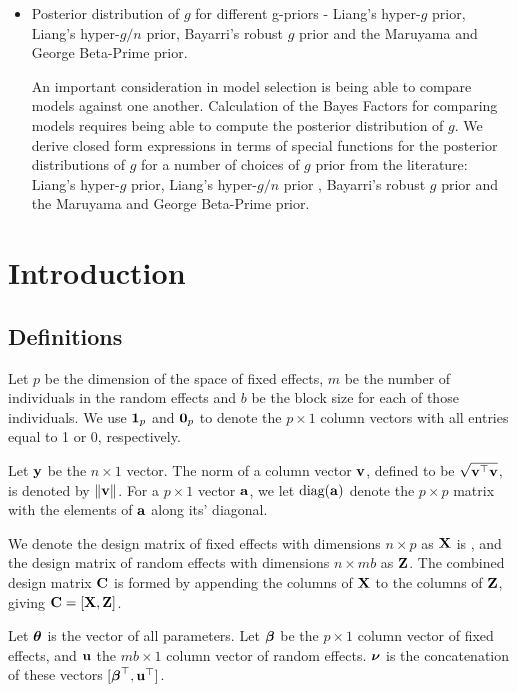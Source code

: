 \documentclass{amsart}[12pt]
\begin{document}
\begin{itemize}
	\item Posterior distribution of $g$ for different g-priors - Liang's hyper-$g$ prior, Liang's hyper-$g/n$ prior,
	Bayarri's robust $g$ prior and the Maruyama and George Beta-Prime prior.

	An important consideration in model selection is being able to compare models against one another.
	Calculation of the Bayes Factors for comparing models requires being able to compute the posterior
	distribution of $g$. We derive closed form expressions in terms of special functions for the posterior
	distributions of $g$ for a number of choices of $g$ prior from the literature:
	Liang's hyper-$g$ prior,
	Liang's hyper-$g/n$ prior \citep{Liang2008},
	Bayarri's robust $g$ prior \citep{Bayarri2012} and the 
	Maruyama and George Beta-Prime \citep{Maruyama2011}prior.	

\end{itemize}

\section{Introduction}


\subsection{Definitions}

Let $p$ be the dimension of the space of fixed effects, $m$ be the number of individuals in the random effects
and $b$ be the block size for each of those individuals. We use ${\bf 1}_p$ and ${\bf 0}_p$ to denote the $p
\times 1$ column vectors with all entries equal to 1 or 0, respectively.

Let ${\bf y}$ be the $n \times 1$ vector. The norm of a column vector ${\bf v}$, defined to be $\sqrt{{\bf v}^\top {\bf v}}$,
is  denoted by $\|{\bf v}\|$. For a $p \times 1$ vector ${\bf a}$, we let $\text{diag}{({\bf a})}$ denote the $p \times p$
matrix with the elements of ${\bf a}$ along its' diagonal.

We denote the design matrix of fixed effects with dimensions $n \times p$ as ${\bf X}$ is , and the design matrix
of random  effects with dimensions $n \times m b$ as ${\bf Z}$. The combined design matrix ${\bf C}$ is formed by
appending the columns of ${\bf X}$ to the columns of ${\bf Z}$, giving ${\bf C} = [ {\bf X}, {\bf Z} ]$.

Let ${\boldsymbol \theta}$ is the vector of all parameters.
Let ${\boldsymbol \beta}$ be the $p \times 1$ column vector of fixed
effects, and ${\bf u}$ the $m b \times 1$ column vector of random effects. ${\boldsymbol \nu}$ is the
concatenation of these vectors $[{\boldsymbol \beta}^\top, {\bf u}^\top]$.
\end{document}
